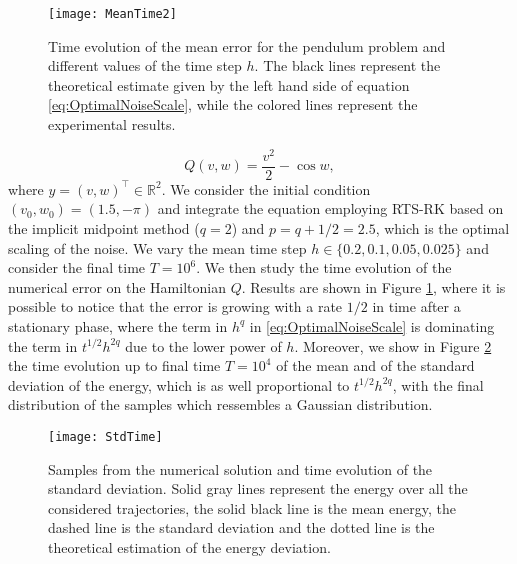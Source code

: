\documentclass{siamart1116}
\numberwithin{theorem}{section}
\newcommand{\R}{\mathbb{R}}
\newcommand{\corr}[1]{{\color{red}#1}}
\begin{document}
\begin{figure}[t]
	\centering
	\texttt{[image: MeanTime2]}
	\caption{Time evolution of the mean error for the pendulum problem and different values of the time step $h$. \corr{The black lines represent the theoretical estimate given by the left hand side of equation \eqref{eq:OptimalNoiseScale}, while the colored lines represent the experimental results.}}
	\label{fig:MeanTime}	
\end{figure}
 \corr{
\begin{equation}
	Q(v, w) = \frac{v^2}{2} - \cos w,
\end{equation}
where $y = (v, w)^\top \in \R^2$.} We consider the initial condition \corr{$(v_0, w_0) = (1.5, -\pi)$} and integrate the equation employing RTS-RK based on the implicit midpoint method ($q = 2$) and \corr{$p = q + 1/2 = 2.5$, which is the optimal scaling of the noise}. We vary the mean time step $h \in \{0.2, 0.1, 0.05, 0.025\}$ and consider the final time $T = 10^6$. We then study the time evolution of the numerical error on the Hamiltonian $Q$. Results are shown in Figure \ref{fig:MeanTime}, where it is possible to notice that the error is growing with a rate $1/2$ in time after a stationary phase, where the term in $h^q$ in \corr{\eqref{eq:OptimalNoiseScale}} is dominating the term in \corr{$t^{1/2}h^{2q}$} due to the lower power of $h$. Moreover, we show in Figure \ref{fig:StdTime} \corr{the time evolution up to final time $T = 10^4$ of the mean and of the standard deviation of the energy, which} is as well proportional to \corr{$t^{1/2}h^{2q}$}, with the \corr{final distribution of the samples which ressembles a Gaussian distribution.}

\begin{figure}[t]
	\centering
	\texttt{[image: StdTime]}
	\caption{Samples from the numerical solution and time evolution of the standard deviation. \corr{Solid gray lines represent the energy over all the considered trajectories, the solid black line is the mean energy, the dashed line is the standard deviation and the dotted line is the theoretical estimation of the energy deviation.}}
	\label{fig:StdTime}	
\end{figure}
\end{document}
